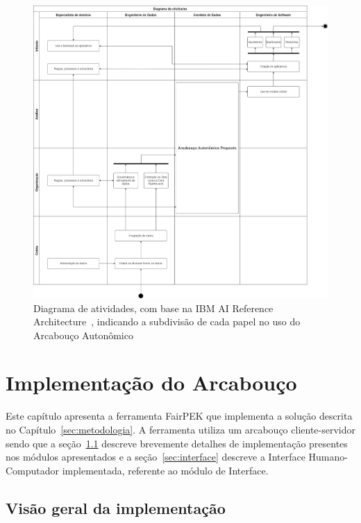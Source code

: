 \documentclass[Portugues,Final]{ic-tese-v3}
\begin{document}
\begin{figure}[H]
\centering
\includegraphics[scale=0.25]{images/Diagrama_Atividades.jpg}
\caption {Diagrama de atividades, com base na IBM AI Reference Architecture~\cite{IBM_2021}, indicando a subdivisão de cada papel no uso do Arcabouço Autonômico}
\label{fig:AIRoles}
\end{figure}

\chapter{Implementação do Arcabouço}

Este capítulo apresenta a ferramenta FairPEK que implementa a solução descrita no Capítulo~\ref{sec:metodologia}. A ferramenta utiliza um arcabouço cliente-servidor sendo que a seção~\ref{sec:VisaoGeral} descreve brevemente detalhes de implementação presentes nos módulos apresentados e a seção~\ref{sec:interface} descreve a Interface Humano-Computador implementada, referente ao módulo de Interface.

\section{Visão geral da implementação}
\label{sec:VisaoGeral}
\end{document}

